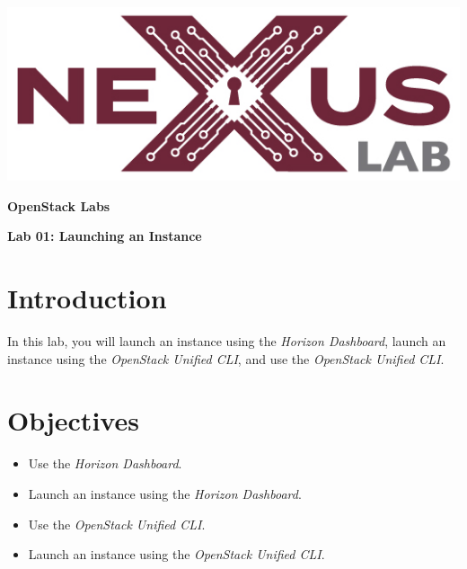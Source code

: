 \documentclass[letterpaper, 12pt]{article}
\begin{document}
\begin{titlepage}
    \centering
    \includegraphics[scale=0.5]{images/nexus_lab_logo.png}

    \vspace*{\baselineskip}

    \textbf{\Large OpenStack Labs}

    \vspace*{\baselineskip}

    \textbf{\Large Lab 01: Launching an Instance}
    \vspace*{\fill}
\end{titlepage}

\pagestyle{fancy}
\tableofcontents
\clearpage

\section*{Introduction}
\label{sec:introduction}
In this lab, you will launch an instance using the \textit{Horizon Dashboard}, launch an instance using the
\textit{OpenStack Unified CLI}, and use the \textit{OpenStack Unified CLI}.

\section*{Objectives}
\label{sec:objectives}
\begin{itemize}[itemsep=0pt]
    \item Use the \textit{Horizon Dashboard}.
    \item Launch an instance using the \textit{Horizon Dashboard}.
    \item Use the \textit{OpenStack Unified CLI}.
    \item Launch an instance using the \textit{OpenStack Unified CLI}.
\end{itemize}
\clearpage
\end{document}
